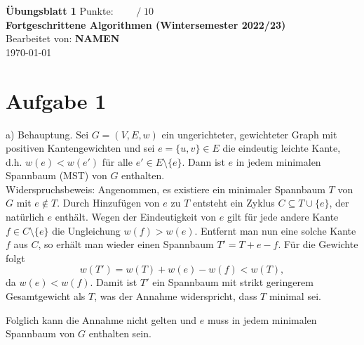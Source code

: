 \documentclass[a4paper]{scrartcl}
\def\sheetNumber{1}
\def\names{NAMEN}
\def\sumPoints{10}
\begin{document}
 

\begin{doublespace} %
\noindent \textbf{\LARGE{Übungsblatt \sheetNumber}}
\hfill  {\large Punkte: $\boxed{\qquad  /\; \sumPoints}$}\\
{\Large \textbf{Fortgeschrittene Algorithmen (Wintersemester 2022/23)}\\
Bearbeitet von: \textbf{\names}\\
\today}
\end{doublespace}


\section*{Aufgabe 1}

a) Behauptung. Sei \(G=(V,E,w)\) ein ungerichteter, gewichteter Graph mit positiven Kantengewichten und sei
\(e=\{u,v\}\in E\) die eindeutig leichte Kante, d.h. \(w(e)<w(e')\) für alle \(e'\in E\setminus\{e\}\).
Dann ist \(e\) in jedem minimalen Spannbaum (MST) von \(G\) enthalten.\\

Widerspruchsbeweis: Angenommen, es existiere ein minimaler Spannbaum \(T\) von \(G\) mit \(e\notin T\).
Durch Hinzufügen von \(e\) zu \(T\) entsteht ein Zyklus \(C\subseteq T\cup\{e\}\), der natürlich \(e\) enthält.
Wegen der Eindeutigkeit von \(e\) gilt für jede andere Kante \(f\in C\setminus\{e\}\) die Ungleichung \(w(f)>w(e)\).
Entfernt man nun eine solche Kante \(f\) aus \(C\), so erhält man wieder einen Spannbaum
\(T' = T + e - f\). Für die Gewichte folgt
\[
w(T') = w(T) + w(e) - w(f) < w(T),
\]
da \(w(e)<w(f)\). Damit ist \(T'\) ein Spannbaum mit strikt geringerem Gesamtgewicht als \(T\), was der Annahme widerspricht, dass \(T\) minimal sei.

Folglich kann die Annahme nicht gelten und \(e\) muss in jedem minimalen Spannbaum von \(G\) enthalten sein.

\end{document}
